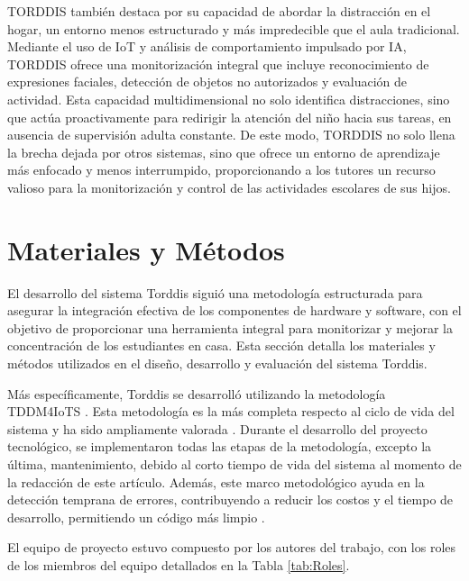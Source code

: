 \documentclass[a4paper,fleqn]{cas-sc}
\begin{document}
	TORDDIS también destaca por su capacidad de abordar la distracción en el hogar, un entorno menos estructurado y más impredecible que el aula tradicional. Mediante el uso de IoT y análisis de comportamiento impulsado por IA, TORDDIS ofrece una monitorización integral que incluye reconocimiento de expresiones faciales, detección de objetos no autorizados y evaluación de actividad. Esta capacidad multidimensional no solo identifica distracciones, sino que actúa proactivamente para redirigir la atención del niño hacia sus tareas, en ausencia de supervisión adulta constante. De este modo, TORDDIS no solo llena la brecha dejada por otros sistemas, sino que ofrece un entorno de aprendizaje más enfocado y menos interrumpido, proporcionando a los tutores un recurso valioso para la monitorización y control de las actividades escolares de sus hijos.
		
	\section{Materiales y Métodos}
	\label{seccion:Cuatro}
	El desarrollo del sistema Torddis siguió una metodología estructurada para asegurar la integración efectiva de los componentes de hardware y software, con el objetivo de proporcionar una herramienta integral para monitorizar y mejorar la concentración de los estudiantes en casa. Esta sección detalla los materiales y métodos utilizados en el diseño, desarrollo y evaluación del sistema Torddis.
	
	Más específicamente, Torddis se desarrolló utilizando la metodología TDDM4IoTS \citep{Guerrero-Ulloa2020TDDM4IoTS}. Esta metodología es la más completa respecto al ciclo de vida del sistema \citep{Guerrero-Ulloa2023Review} y ha sido ampliamente valorada \citep{Guerrero-Ulloa2023DevIdeAir,Guerrero-Ulloa2023IdeAir,Guerrero-Ulloa2023SP4,Guerrero-Ulloa2023Nawi}. Durante el desarrollo del proyecto tecnológico, se implementaron todas las etapas de la metodología, excepto la última, mantenimiento, debido al corto tiempo de vida del sistema al momento de la redacción de este artículo. Además, este marco metodológico ayuda en la detección temprana de errores, contribuyendo a reducir los costos y el tiempo de desarrollo, permitiendo un código más limpio \citep{Beck2002TDD}.
	
	El equipo de proyecto estuvo compuesto por los autores del trabajo, con los roles de los miembros del equipo detallados en la Tabla \ref{tab:Roles}.
	
\end{document}
